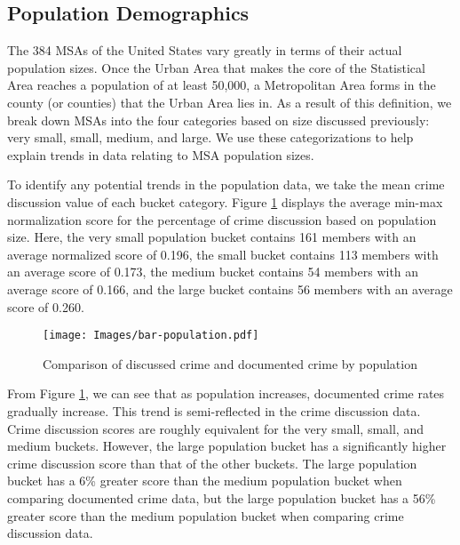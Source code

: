 \documentclass[12pt,oneside, letterpaper]{book}
\begin{document}
\subsection{Population Demographics}

\par The 384 MSAs of the United States vary greatly in terms of their actual population sizes. Once the Urban Area that makes the core of the Statistical Area reaches a population of at least 50,000, a Metropolitan Area forms in the county (or counties) that the Urban Area lies in. As a result of this definition, we break down MSAs into the four categories based on size discussed previously: very small, small, medium, and large. We use these categorizations to help explain trends in data relating to MSA population sizes.

\par To identify any potential trends in the population data, we take the mean crime discussion value of each bucket category. Figure \ref{fig:graph-1} displays the average min-max normalization score for the percentage of crime discussion based on population size. Here, the very small population bucket contains 161 members with an average normalized score of 0.196, the small bucket contains 113 members with an average score of 0.173, the medium bucket contains 54 members with an average score of 0.166, and the large bucket contains 56 members with an average score of 0.260.

\begin{figure}[ht]
    \centering
    \texttt{[image: Images/bar-population.pdf]}
    \caption{Comparison of discussed crime and documented crime by population}
    \label{fig:graph-1}
\end{figure}

\par From Figure \ref{fig:graph-1}, we can see that as population increases, documented crime rates gradually increase. This trend is semi-reflected in the crime discussion data. Crime discussion scores are roughly equivalent for the very small, small, and medium buckets. However, the large population bucket has a significantly higher crime discussion score than that of the other buckets. The large population bucket has a 6\% greater score than the medium population bucket when comparing documented crime data, but the large population bucket has a 56\% greater score than the medium population bucket when comparing crime discussion data.
\end{document}
